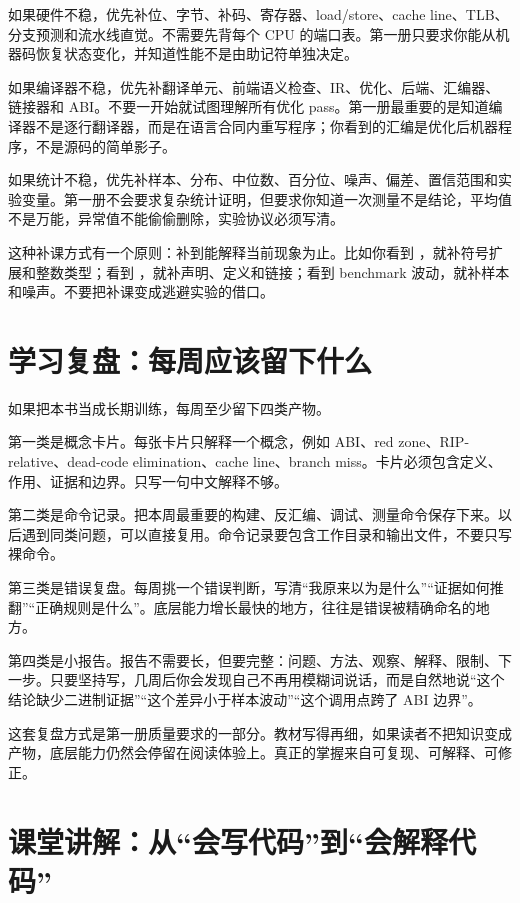 如果硬件不稳，优先补位、字节、补码、寄存器、load/store、cache line、TLB、分支预测和流水线直觉。不需要先背每个 CPU 的端口表。第一册只要求你能从机器码恢复状态变化，并知道性能不是由助记符单独决定。

如果编译器不稳，优先补翻译单元、前端语义检查、IR、优化、后端、汇编器、链接器和 ABI。不要一开始就试图理解所有优化 pass。第一册最重要的是知道编译器不是逐行翻译器，而是在语言合同内重写程序；你看到的汇编是优化后机器程序，不是源码的简单影子。

如果统计不稳，优先补样本、分布、中位数、百分位、噪声、偏差、置信范围和实验变量。第一册不会要求复杂统计证明，但要求你知道一次测量不是结论，平均值不是万能，异常值不能偷偷删除，实验协议必须写清。

这种补课方式有一个原则：补到能解释当前现象为止。比如你看到 ，就补符号扩展和整数类型；看到 ，就补声明、定义和链接；看到 benchmark 波动，就补样本和噪声。不要把补课变成逃避实验的借口。

\section{学习复盘：每周应该留下什么}

如果把本书当成长期训练，每周至少留下四类产物。

第一类是概念卡片。每张卡片只解释一个概念，例如 ABI、red zone、RIP-relative、dead-code elimination、cache line、branch miss。卡片必须包含定义、作用、证据和边界。只写一句中文解释不够。

第二类是命令记录。把本周最重要的构建、反汇编、调试、测量命令保存下来。以后遇到同类问题，可以直接复用。命令记录要包含工作目录和输出文件，不要只写裸命令。

第三类是错误复盘。每周挑一个错误判断，写清“我原来以为是什么”“证据如何推翻”“正确规则是什么”。底层能力增长最快的地方，往往是错误被精确命名的地方。

第四类是小报告。报告不需要长，但要完整：问题、方法、观察、解释、限制、下一步。只要坚持写，几周后你会发现自己不再用模糊词说话，而是自然地说“这个结论缺少二进制证据”“这个差异小于样本波动”“这个调用点跨了 ABI 边界”。

这套复盘方式是第一册质量要求的一部分。教材写得再细，如果读者不把知识变成产物，底层能力仍然会停留在阅读体验上。真正的掌握来自可复现、可解释、可修正。

\section{课堂讲解：从“会写代码”到“会解释代码”}

